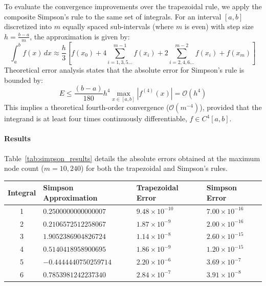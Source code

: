 \begin{solution}
	To evaluate the convergence improvements over the trapezoidal rule, we apply
	the composite Simpson's rule to the same set of integrals. For an interval
	$[a, b]$ discretized into $m$ equally spaced sub-intervals (where $m$ is even)
	with step size $h = \frac{b-a}{m}$, the approximation is given by:
	\[
		\int_a^b f(x) \, dx \approx \frac{h}{3} \left[ f(x_0) + 4
			\sum_{i=1,3,5\ldots}^{m-1} f(x_i) + 2 \sum_{i=2,4,6\ldots}^{m-2} f(x_i) +
			f(x_m) \right]
	\]
	Theoretical error analysis states that the absolute error for Simpson's rule
	is bounded by:
	\[
		E \leq \frac{(b-a)}{180} h^4 \max_{x \in [a,b]} |f^{(4)}(x)| =
		\mathcal{O}(h^4)
	\]
	This implies a theoretical fourth-order convergence ($\mathcal{O}(m^{-4})$),
	provided that the integrand is at least four times continuously
	differentiable, $f \in C^4[a,b]$.

	\paragraph{Results}
	Table~\ref{tab:simpson_results} details the absolute errors obtained at the
	maximum node count ($m = 10,240$) for both the trapezoidal and Simpson's
	rules.

	\begin{center}
		\centering
		\label{tab:simpson_results}
		\renewcommand{\arraystretch}{1.2}
		\begin{tabular}{clll}
			\toprule
			Integral & Simpson Approximation & Trapezoidal Error      & Simpson Error          \\
			\midrule
			1        & $0.2500000000000007$  & $9.48 \times 10^{-10}$ & $7.00 \times 10^{-16}$ \\
			2        & $0.2106572512258067$  & $1.87 \times 10^{-9}$  & $2.00 \times 10^{-16}$ \\
			3        & $1.9052386904826724$  & $1.14 \times 10^{-8}$  & $2.60 \times 10^{-15}$ \\
			4        & $0.5140418958900695$  & $1.86 \times 10^{-9}$  & $1.20 \times 10^{-15}$ \\
			5        & $-0.4444440750259714$ & $2.20 \times 10^{-6}$  & $3.69 \times 10^{-7}$  \\
			6        & $0.7853981242237340$  & $2.84 \times 10^{-7}$  & $3.91 \times 10^{-8}$  \\
			\bottomrule
		\end{tabular}
	\end{center}


\end{solution}
